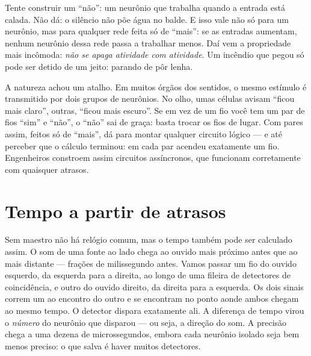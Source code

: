 Tente construir um ``não'': um neurônio que trabalha quando a entrada está calada. Não dá: o silêncio não põe água no balde. E isso vale não só para um neurônio, mas para qualquer rede feita só de ``mais'': se as entradas aumentam, nenhum neurônio dessa rede passa a trabalhar menos. Daí vem a propriedade mais incômoda: \emph{não se apaga atividade com atividade}. Um incêndio que pegou só pode ser detido de um jeito: parando de pôr lenha.

A natureza achou um atalho. Em muitos órgãos dos sentidos, o mesmo estímulo é transmitido por dois grupos de neurônios. No olho, umas células avisam ``ficou mais claro'', outras, ``ficou mais escuro''. Se em vez de um fio você tem um par de fios ``sim'' e ``não'', o ``não'' sai de graça: basta trocar os fios de lugar. Com pares assim, feitos só de ``mais'', dá para montar qualquer circuito lógico --- e até perceber que o cálculo terminou: em cada par acendeu exatamente um fio. Engenheiros constroem assim circuitos assíncronos, que funcionam corretamente com quaisquer atrasos.

\section*{Tempo a partir de atrasos}

Sem maestro não há relógio comum, mas o tempo também pode ser calculado assim. O som de uma fonte ao lado chega ao ouvido mais próximo antes que ao mais distante --- frações de milissegundo antes. Vamos passar um fio do ouvido esquerdo, da esquerda para a direita, ao longo de uma fileira de detectores de coincidência, e outro do ouvido direito, da direita para a esquerda. Os dois sinais correm um ao encontro do outro e se encontram no ponto aonde ambos chegam ao mesmo tempo. O detector dispara exatamente ali. A diferença de tempo virou o \emph{número} do neurônio que disparou --- ou seja, a direção do som. A precisão chega a uma dezena de microssegundos, embora cada neurônio isolado seja bem menos preciso: o que salva é haver muitos detectores.

